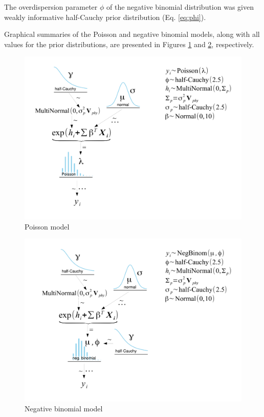 \documentclass[12pt,letterpaper]{article}
\begin{document}
The overdispersion parameter \(\phi\) of the negative binomial distribution was given weakly informative half-Cauchy prior distribution (Eq. \ref{eq:phi}).

Graphical summaries of the Poisson and negative binomial models, along with all values for the prior distributions, are presented in Figures \ref{fig:poismod_diagram} and \ref{fig:nbinmod_diagram}, respectively.
\begin{figure}[ht]
  \centering
  \includegraphics[height = 0.5\textheight, width = \textwidth, keepaspectratio = true]{figure/mammal_degree_model}
  \caption{Poisson model}
  \label{fig:poismod_diagram}
\end{figure}

\begin{figure}[ht]
  \centering
  \includegraphics[height = 0.5\textheight, width = \textwidth, keepaspectratio = true]{figure/mammal_deg_over_model}
  \caption{Negative binomial model}
  \label{fig:nbinmod_diagram}
\end{figure}
\end{document}
